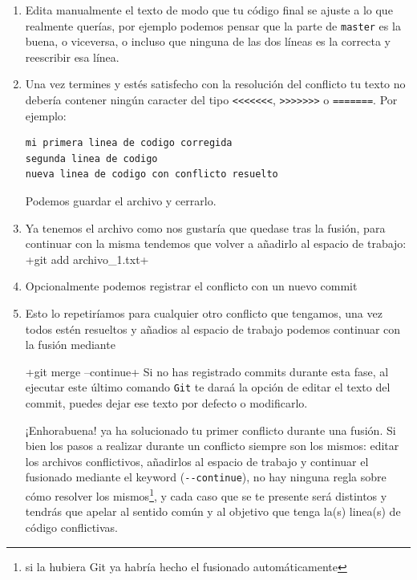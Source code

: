 \documentclass[a5paper, oneside,10pt]{article}
\begin{document}
\begin{enumerate}
    \item Edita manualmente el texto de modo que tu código final se ajuste a lo que realmente querías, por ejemplo podemos pensar que la parte de \verb+master+ es la buena, o viceversa, o incluso que ninguna de las dos líneas es la correcta y reescribir esa línea.
    
    \item Una vez termines y estés satisfecho con la resolución del conflicto tu texto no debería contener ningún caracter del tipo \verb+<<<<<<<+, \verb+>>>>>>>+ o \verb+=======+. Por ejemplo:
  
    \begin{lstlisting}[style=custom]
mi primera linea de codigo corregida
segunda linea de codigo
nueva linea de codigo con conflicto resuelto
    \end{lstlisting}
    
    Podemos guardar el archivo y cerrarlo.
    
    \item Ya tenemos el archivo como nos gustaría que quedase tras la fusión, para continuar con la misma tendemos que volver a añadirlo al espacio de trabajo:
    \cverb+git add archivo_1.txt+
    
    \item Opcionalmente podemos registrar el conflicto con un nuevo commit
    
    \item Esto lo repetiríamos para cualquier otro conflicto que tengamos, una vez todos estén resueltos y añadios al espacio de trabajo podemos continuar con la fusión mediante
    
    \cverb+git merge --continue+
    Si no has registrado commits durante esta fase, al ejecutar este último comando \verb+Git+ te daraá la opción de editar el texto del commit, puedes dejar ese texto por defecto o modificarlo.
    
    ¡Enhorabuena! ya ha solucionado tu primer conflicto durante una fusión. Si bien los pasos a realizar durante un conflicto siempre son los mismos: editar los archivos conflictivos, añadirlos al espacio de trabajo y continuar el fusionado mediante el keyword (\verb+--continue+), no hay ninguna regla sobre cómo resolver los mismos\footnote{si la hubiera Git ya habría hecho el fusionado automáticamente}, y cada caso que se te presente será distintos y tendrás que apelar al sentido común y al objetivo que tenga la(s) linea(s) de código conflictivas.
     
    \end{enumerate}
\end{document}
